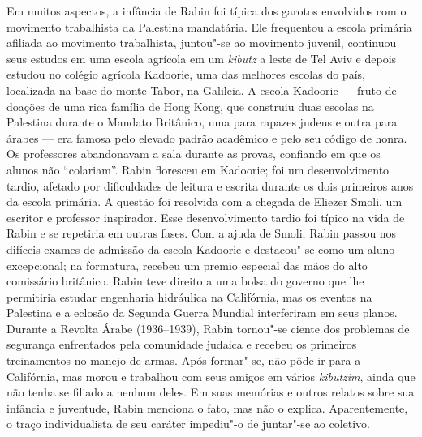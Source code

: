 Em muitos aspectos, a infância de Rabin foi típica dos garotos
envolvidos com o movimento trabalhista da Palestina mandatária. Ele
frequentou a escola primária afiliada ao movimento trabalhista,
juntou"-se ao movimento juvenil, continuou seus estudos em uma escola
agrícola em um \emph{kibutz} a leste de Tel Aviv e depois estudou no colégio
agrícola Kadoorie, uma das melhores escolas do país, localizada na base
do monte Tabor, na Galileia. A escola Kadoorie --- fruto de doações de uma rica
família de Hong Kong, que construiu duas escolas na Palestina durante o
Mandato Britânico, uma para rapazes judeus e outra para árabes --- era famosa pelo
elevado padrão acadêmico e pelo seu código de honra. Os professores
abandonavam a sala durante as provas, confiando em que os alunos não
``colariam''. Rabin floresceu em Kadoorie; foi um desenvolvimento
tardio, afetado por dificuldades de leitura e escrita durante os dois
primeiros anos da escola primária. A questão foi resolvida com a chegada
de Eliezer Smoli, um escritor e professor inspirador. Esse
desenvolvimento tardio foi típico na vida de Rabin e se repetiria em
outras fases. Com a ajuda de Smoli, Rabin passou nos difíceis exames de
admissão da escola Kadoorie e destacou"-se como um aluno excepcional;
na formatura, recebeu um premio especial das mãos do alto comissário
britânico. Rabin teve direito a uma bolsa do governo que lhe permitiria
estudar engenharia hidráulica na Califórnia, mas os eventos na Palestina
e a eclosão da Segunda Guerra Mundial interferiram em seus planos.
Durante a Revolta Árabe (1936--1939), Rabin tornou"-se ciente dos problemas
de segurança enfrentados pela comunidade judaica e recebeu os primeiros
treinamentos no manejo de armas. Após formar"-se, não pôde ir para a
Califórnia, mas morou e trabalhou com seus amigos em vários
\emph{kibutzim}, ainda que não tenha se filiado a nenhum deles. Em suas
memórias e outros relatos sobre sua infância e juventude, Rabin menciona
o fato, mas não o explica. Aparentemente, o traço individualista de seu
caráter impediu"-o de juntar"-se ao coletivo.

